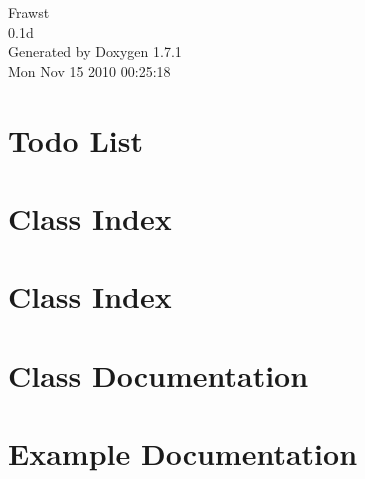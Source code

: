 \documentclass[a4paper]{book}
\begin{document}
\hypersetup{pageanchor=false}
\begin{titlepage}
\vspace*{7cm}
\begin{center}
{\Large Frawst \\[1ex]\large 0.1d }\\
\vspace*{1cm}
{\large Generated by Doxygen 1.7.1}\\
\vspace*{0.5cm}
{\small Mon Nov 15 2010 00:25:18}\\
\end{center}
\end{titlepage}
\clearemptydoublepage
{}
\tableofcontents
\clearemptydoublepage
{}
\hypersetup{pageanchor=true}
\chapter{Todo List}
\label{todo}
\hypertarget{todo}{}

\chapter{Class Index}

\chapter{Class Index}

\chapter{Class Documentation}

































\chapter{Example Documentation}


\printindex
\end{document}
